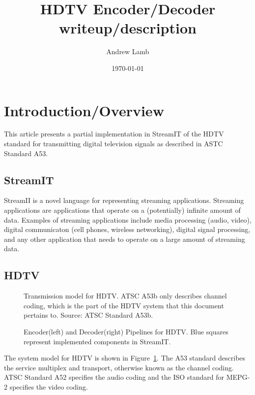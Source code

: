 \documentclass{article}
\title{HDTV Encoder/Decoder writeup/description}
\author{Andrew Lamb}
\date{\today}
\begin{document}
\maketitle
\newpage

\section{Introduction/Overview}

This article presents a partial implementation in StreamIT of the HDTV standard 
for transmitting digital television signals as described in 
ASTC Standard A53\cite{atsc:a53b}. 

\subsection{StreamIT}
StreamII is a novel language for representing streaming applications. Streaming applications 
are applications that operate on a (potentially) infinite amount of data. Examples of 
streaming applications include media processing (audio, video), digital communicaton
(cell phones, wireless networking), digital signal processing, and any other 
application that needs to operate on a large amount of streaming data.

\subsection{HDTV}
\begin{figure}
\center
\epsfxsize=5.5in
\caption{Transmission model for HDTV. ATSC A53b only describes channel coding, which is the part of the HDTV system that this document pertains to. Source: ATSC Standard A53b\cite{atsc:a53b}.}
\label{fig:hdtv-system}
\end{figure}

\begin{figure}
\center
\epsfxsize=6.0in
\epsfxsize=6.0in

\caption{Encoder(left) and Decoder(right) Pipelines for HDTV. Blue squares represent implemented components in StreamIT.}
\label{fig:hdtv-pipeline}
\end{figure}

The system model for HDTV is 
shown in Figure~\ref{fig:hdtv-system}. The A53 standard describes
the service multiplex and transport, otherwise known as the channel coding.
ATSC Standard A52\cite{atsc:a52a} specifies the audio coding and the ISO  
standard for MEPG-2\cite{iso:13818-1}\cite{iso:13818-2} specifies the video coding.
\end{document}
